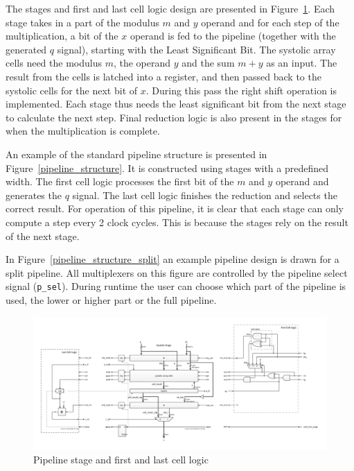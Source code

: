 The stages and first and last cell logic design are presented in Figure~\ref{stage_structure}. Each stage takes in a
part of the modulus $m$ and $y$ operand and for each step of the multiplication, a bit of the $x$ operand is fed to the
pipeline (together with the generated $q$ signal), starting with the Least Significant Bit. The systolic array cells
need the modulus $m$, the operand $y$ and the sum $m+y$ as an input. The result from the cells is latched into a
register, and then passed back to the systolic cells for the next bit of $x$. During this pass the right shift operation
is implemented. Each stage thus needs the least significant bit from the next stage to calculate the next step. Final
reduction logic is also present in the stages for when the multiplication is complete.

An example of the standard pipeline structure is presented in Figure~\ref{pipeline_structure}. It is constructed using
stages with a predefined width. The first cell logic processes the first bit of the $m$ and $y$ operand and generates
the $q$ signal. The last cell logic finishes the reduction and selects the correct result. For operation of this
pipeline, it is clear that each stage can only compute a step every 2 clock cycles. This is because the stages rely on
the result of the next stage.

In Figure~\ref{pipeline_structure_split} an example pipeline design is drawn for a split pipeline. All multiplexers on
this figure are controlled by the pipeline select signal (\verb|p_sel|). During runtime the user can choose which part
of the pipeline is used, the lower or higher part or the full pipeline.

\newpage 
\begin{figure}[H]
\centering
\includegraphics[trim=1.2cm 1.2cm 1.2cm 1.2cm, width=25cm, angle=90]{pictures/sys_stage.pdf}
\caption{Pipeline stage and first and last cell logic}
\label{stage_structure}
\end{figure}
\newpage

